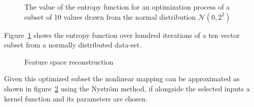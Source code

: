 \begin{figure}
\centering

\caption{The value of the entropy function for an optimization process of a subset of 10 values drawn from the normal distribution $\mathcal{N}(0,2^2)$}
\label{fig:normalEntropy}
\end{figure}
Figure~\ref{fig:normalEntropy} shows the entropy function over hundred iterations of a ten vector subset from a normally distributed data-set. 
\begin{figure}

\caption{Feature space reconstruction}
\label{fig:featureReconstr}
\end{figure}
Given this optimized subset the nonlinear mapping can be approximated as shown in figure~\ref{fig:featureReconstr} using the Nystr\"{o}m method, if alongside the selected inputs a kernel function and its parameters are chosen. 


